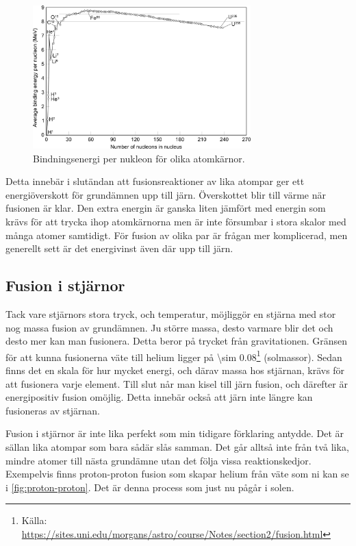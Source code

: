 \begin{figure}
    \centering
    \includegraphics[width=0.75\textwidth]{img/Binding_energy_curve_-_common_isotopes.png}
    \caption{Bindningsenergi per nukleon för olika atomkärnor.}
    \label{fig:binding-energy}
\end{figure}

Detta innebär i slutändan att fusionsreaktioner av lika atompar ger ett energiöverskott för grundämnen upp till järn. Överskottet blir till värme när fusionen är klar. Den extra energin är ganska liten jämfört med energin som krävs för att trycka ihop atomkärnorna men är inte försumbar i stora skalor med många atomer samtidigt. För fusion av olika par är frågan mer komplicerad, men generellt sett är det energivinst även där upp till järn.

\subsection{Fusion i stjärnor}
Tack vare stjärnors stora tryck, och temperatur, möjliggör en stjärna med stor nog massa fusion av grundämnen. Ju större massa, desto varmare blir det och desto mer kan man fusionera. Detta beror på trycket från gravitationen. Gränsen för att kunna fusionerna väte till helium ligger på \qty{\sim 0.08}{\Mo}\footnote{Källa: \textcolor{blue}{\url{https://sites.uni.edu/morgans/astro/course/Notes/section2/fusion.html}}} (solmassor). Sedan finns det en skala för hur mycket energi, och därav massa hos stjärnan, krävs för att fusionera varje element. Till slut når man kisel till järn fusion, och därefter är energipositiv fusion omöjlig. Detta innebär också att järn inte längre kan fusioneras av stjärnan.

Fusion i stjärnor är inte lika perfekt som min tidigare förklaring antydde. Det är sällan lika atompar som bara sådär slås samman. Det går alltså inte från två lika, mindre atomer till nästa grundämne utan det följa vissa reaktionskedjor. Exempelvis finns proton-proton fusion som skapar helium från väte som ni kan se i \cref{fig:proton-proton}. Det är denna process som just nu pågår i solen.

